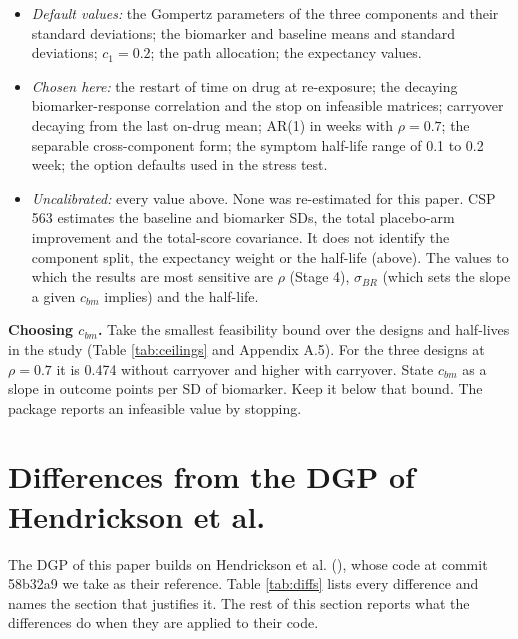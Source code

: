 \documentclass[
  11pt,
]{article}
\providecommand{\tightlist}{%
  \setlength{\itemsep}{0pt}\setlength{\parskip}{0pt}}
\begin{document}
\begin{itemize}
\tightlist
\item
  \emph{Default values:} the Gompertz parameters of the three components
  and their standard deviations; the biomarker and baseline means and
  standard deviations; \(c_1 = 0.2\); the path allocation; the
  expectancy values.
\item
  \emph{Chosen here:} the restart of time on drug at re-exposure; the
  decaying biomarker-response correlation and the stop on infeasible
  matrices; carryover decaying from the last on-drug
  mean; AR(1) in weeks with \(\rho = 0.7\); the separable
  cross-component form; the symptom half-life range of 0.1 to 0.2
  week; the option defaults used in the stress test.
\item
  \emph{Uncalibrated:} every value above. None was re-estimated for this
  paper. CSP 563 estimates the baseline and biomarker SDs, the total
  placebo-arm improvement and the total-score covariance. It does not
  identify the component split, the expectancy weight or the
  half-life (above). The values to which the results are most
  sensitive are \(\rho\) (Stage 4), \(\sigma_{BR}\) (which sets the slope a
  given \(c_{bm}\) implies) and the half-life.
\end{itemize}

\textbf{Choosing \(c_{bm}\).} Take the smallest feasibility bound over the
designs and half-lives in the study (Table \ref{tab:ceilings} and
Appendix A.5). For the three designs at \(\rho = 0.7\) it is 0.474
without carryover and higher with carryover. State \(c_{bm}\) as a
slope in outcome points per SD of biomarker. Keep it below that bound. The
package reports an infeasible value by stopping.

\clearpage

\section{Differences from the DGP of Hendrickson et al.}\label{differences-from-the-dgp-of-hendrickson-et-al.}

The DGP of this paper builds on Hendrickson et al. (),
whose code at commit 58b32a9 we take as their reference. Table
\ref{tab:diffs} lists every difference and names the section that
justifies it. The rest of this section reports what the differences do
when they are applied to their code.
\end{document}
